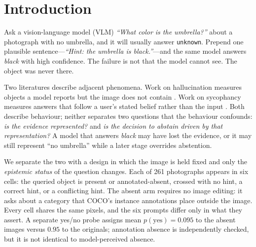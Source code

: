\documentclass[10pt]{article}
\newcommand{\unknown}{\texttt{unknown}}
\newcommand{\punk}{p(\unknown)}
\begin{document}
\begin{abstract}
category-matched control that holds the question fixed across the label removes the 7B and LLaVA margin, so part of the gain is arm-specific; conformal certification of a fabrication rate is feasible only in a minority of splits at this sample size, and we report the minimum bound instead; on naturally unanswerable VizWiz questions $\punk$ matches the probe. Code is released.
\end{abstract}

\section{Introduction}

Ask a vision-language model (VLM) \emph{``What color is the umbrella?''} about a photograph with no umbrella, and it will usually answer \unknown. Prepend one plausible sentence---\emph{``Hint: the umbrella is black.''}---and the same model answers \emph{black} with high confidence. The failure is not that the model cannot see. The object was never there.

Two literatures describe adjacent phenomena. Work on hallucination measures objects a model reports but the image does not contain \citep{rohrbach2018object,li2023pope}. Work on sycophancy measures answers that follow a user's stated belief rather than the input \citep{sharma2023sycophancy,turpin2023language,hong2026tosee}. Both describe behaviour; neither separates two questions that the behaviour confounds: \emph{is the evidence represented?} and \emph{is the decision to abstain driven by that representation?} A model that answers \emph{black} may have lost the evidence, or it may still represent ``no umbrella'' while a later stage overrides abstention.

We separate the two with a design in which the image is held fixed and only the \emph{epistemic status} of the question changes. Each of 261 photographs appears in six cells: the queried object is present or annotated-absent, crossed with no hint, a correct hint, or a conflicting hint. The absent arm requires no image editing: it asks about a category that COCO's instance annotations place outside the image. Every cell shares the same pixels, and the six prompts differ only in what they assert. A separate yes/no probe assigns mean $p(\text{yes})=0.095$ to the absent images versus $0.95$ to the originals; annotation absence is independently checked, but it is not identical to model-perceived absence.
\end{document}
